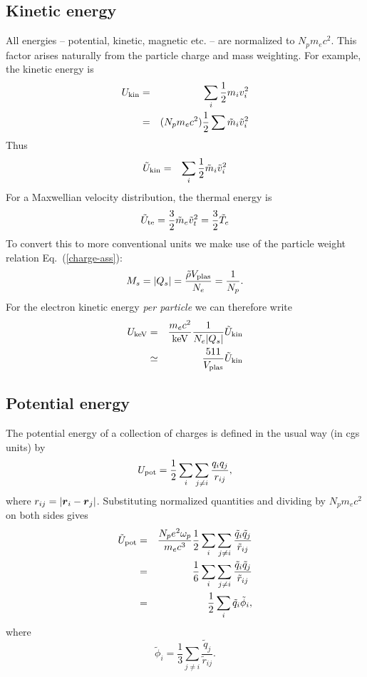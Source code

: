 \documentclass[11pt,psfig]{article}
\def\be{\begin{equation}}
\def\ee{\end{equation}}
\def\bea{\begin{eqnarray}}
\def\eea{\end{eqnarray}}
\newcommand{\bm}[1]{\mbox{\boldmath$#1$}}
\newcommand{\fhalf}{\frac{1}{2}}
\newcommand{\eq}[1]{Eq.~(\ref{#1})}
\newcommand{\downbox}[1]{_{\mbox{\scriptsize\rm #1}}}
\begin{document}
\subsection{Kinetic energy}
All energies -- potential, kinetic, magnetic etc. -- are normalized to $N_pm_ec^2$.  This factor arises naturally from the particle charge and mass weighting. For example, the kinetic energy is
\bea
U\downbox{kin} &=& \sum_i\fhalf m_iv_i^2 \nonumber\\
& = & (N_pm_ec^2) \fhalf\sum\tilde{m}_i\tilde{v}_i^2 \nonumber
\eea
Thus
\bea
\tilde{U}\downbox{kin} &=& \sum_i\fhalf \tilde{m}_i\tilde{v}_i^2
\eea
For a Maxwellian velocity distribution, the thermal energy is 
\be
\tilde{U}\downbox{te} = \frac{3}{2} \tilde{m}_e\tilde{v}_t^2 = \frac{3}{2} \tilde{T}_e
\ee
To convert this to more conventional units we make use of the particle weight relation \eq{charge-ass}:
$$
M_s = |Q_s| = \frac{\tilde{\rho}V\downbox{plas}}{N_e} = \frac{1}{N_p}.
$$ 
For the electron kinetic energy \textit{per particle} we can therefore write
\bea
U\downbox{keV} &=& \frac{m_ec^2}{\mbox{keV}}\frac{1}{N_e|Q_s|} \tilde{U}\downbox{kin} \nonumber \\
& \simeq &  \frac{511}{V\downbox{plas}}\tilde{U}\downbox{kin}
\eea
\subsection{Potential energy}
The potential energy of a collection of charges is defined in the usual way (in cgs units) by
\bea
U\downbox{pot} = \fhalf \sum_i\sum_{j\neq i} \frac{q_iq_j}{r_{ij}},
\eea
where $r_{ij}=|\bm{r}_i-\bm{r}_j|$.
Substituting normalized quantities  and dividing by $N_pm_ec^2$ on both sides gives
\bea
\tilde{U}\downbox{pot} &=& \frac{N_pe^2\omega_p}{m_ec^3}\fhalf\sum_i\sum_{j\neq i} \frac{\tilde{q}_i\tilde{q}_j}{\tilde{r}_{ij}} \nonumber \\
& = & \frac{1}{6} \sum_i\sum_{j\neq i} \frac{\tilde{q}_i\tilde{q}_j}{\tilde{r}_{ij}} \nonumber \\
& = & \fhalf \sum_i \tilde{q}_i \tilde{\phi}_i,
\eea
where
$$
\tilde{\phi}_i = \frac{1}{3} \sum_{j\neq i} \frac{\tilde{q}_j}{\tilde{r}_{ij}}.
$$
\end{document}
